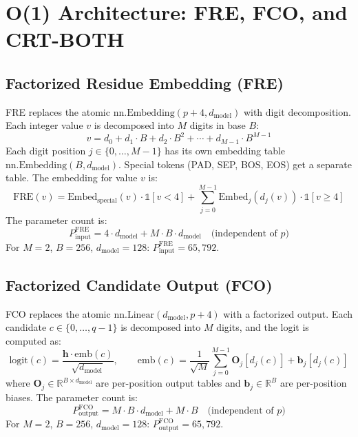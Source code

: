 \documentclass[11pt]{article}
\newcommand{\R}{\mathbb{R}}
\newcommand{\Pinput}{P_{\mathrm{input}}}
\newcommand{\Poutput}{P_{\mathrm{output}}}
\newcommand{\dmodel}{d_{\mathrm{model}}}
\begin{document}

\section{O(1) Architecture: FRE, FCO, and CRT-BOTH}
\label{sec:arch}

\subsection{Factorized Residue Embedding (FRE)}

FRE replaces the atomic $\mathrm{nn.Embedding}(p+4, \dmodel)$ with digit decomposition. Each integer value $v$ is decomposed into $M$ digits in base $B$:
\begin{equation}
    v = d_0 + d_1 \cdot B + d_2 \cdot B^2 + \cdots + d_{M-1} \cdot B^{M-1}
\end{equation}
Each digit position $j \in \{0, \ldots, M-1\}$ has its own embedding table $\mathrm{nn.Embedding}(B, \dmodel)$. Special tokens (PAD, SEP, BOS, EOS) get a separate table. The embedding for value $v$ is:
\begin{equation}
    \mathrm{FRE}(v) = \mathrm{Embed}_{\mathrm{special}}(v) \cdot \mathbb{1}[v < 4] + \sum_{j=0}^{M-1} \mathrm{Embed}_j(d_j(v)) \cdot \mathbb{1}[v \geq 4]
\end{equation}
The parameter count is:
\begin{equation}
    \Pinput^{\mathrm{FRE}} = 4 \cdot \dmodel + M \cdot B \cdot \dmodel \quad \text{(independent of } p \text{)}
\end{equation}
For $M = 2$, $B = 256$, $\dmodel = 128$: $\Pinput^{\mathrm{FRE}} = 65{,}792$.

\subsection{Factorized Candidate Output (FCO)}

FCO replaces the atomic $\mathrm{nn.Linear}(\dmodel, p+4)$ with a factorized output. Each candidate $c \in \{0, \ldots, q-1\}$ is decomposed into $M$ digits, and the logit is computed as:
\begin{equation}
    \mathrm{logit}(c) = \frac{\mathbf{h} \cdot \mathrm{emb}(c)}{\sqrt{\dmodel}}, \qquad
    \mathrm{emb}(c) = \frac{1}{\sqrt{M}} \sum_{j=0}^{M-1} \mathbf{O}_j[d_j(c)] + \mathbf{b}_j[d_j(c)]
\end{equation}
where $\mathbf{O}_j \in \R^{B \times \dmodel}$ are per-position output tables and $\mathbf{b}_j \in \R^B$ are per-position biases. The parameter count is:
\begin{equation}
    \Poutput^{\mathrm{FCO}} = M \cdot B \cdot \dmodel + M \cdot B \quad \text{(independent of } p \text{)}
\end{equation}
For $M = 2$, $B = 256$, $\dmodel = 128$: $\Poutput^{\mathrm{FCO}} = 65{,}792$.
\end{document}
